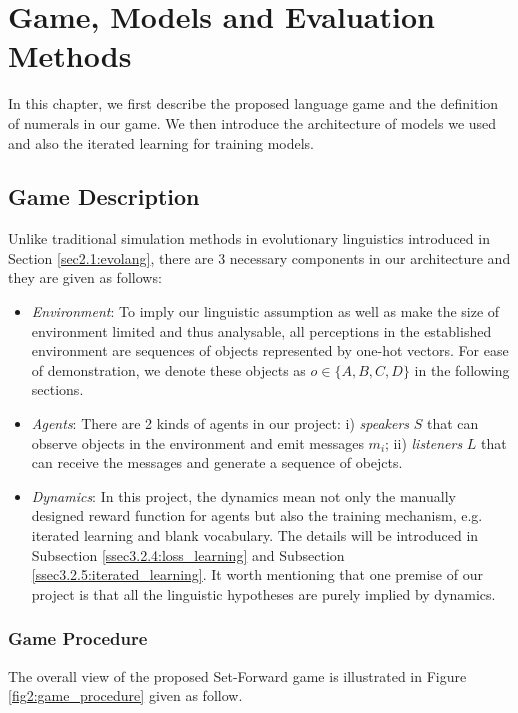\chapter{Game, Models and Evaluation Methods}
\label{ch3:game_model}

In this chapter, we first describe the proposed language game and the definition of numerals in our game. We then introduce the architecture of models we used and also the iterated learning for training models.

\section{Game Description}
\label{sec3.1:game_description}

Unlike traditional simulation methods in evolutionary linguistics introduced in Section \ref{sec2.1:evolang}, there are 3 necessary components in our architecture and they are given as follows:

\begin{itemize}
  \item \textit{Environment}: To imply our linguistic assumption as well as make the size of environment limited and thus analysable, all perceptions in the established environment are sequences of objects represented by one-hot vectors. For ease of demonstration, we denote these objects as $o \in \{ A, B, C, D\}$ in the following sections.
  \item \textit{Agents}: There are 2 kinds of agents in our project: i) \textit{speakers} $S$ that can observe objects in the environment and emit messages $m_i$; ii) \textit{listeners} $L$ that can receive the messages and generate a sequence of obejcts.
  \item \textit{Dynamics}: In this project, the dynamics mean not only the manually designed reward function for agents but also the training mechanism, e.g. iterated learning and blank vocabulary. The details will be introduced in Subsection \ref{ssec3.2.4:loss_learning} and Subsection \ref{ssec3.2.5:iterated_learning}. It worth mentioning that one premise of our project is that all the linguistic hypotheses are purely implied by dynamics.
\end{itemize}

\subsection{Game Procedure}
\label{ssec3.1.1:game_procedure}

The overall view of the proposed Set-Forward game is illustrated in Figure \ref{fig2:game_procedure} given as follow.

